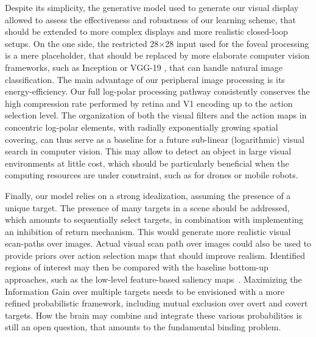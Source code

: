Despite its simplicity, the generative model used to generate our visual display allowed to assess the effectiveness and robustness of our learning scheme, that should be extended to more complex displays and more realistic closed-loop setups.
On the one side, the restricted 28$\times$28 input used for the foveal processing is a mere placeholder, that should be replaced by more elaborate computer vision frameworks, such as Inception \cite{szegedy2015going} or VGG-19
\cite{simonyan2014very}, that can handle natural image classification. 
The main advantage of our peripheral image processing is its  energy-efficiency. Our full log-polar processing pathway consistently conserves the high compression rate performed by retina and V1 encoding up to the action selection level. The organization of both the visual filters and the action maps in concentric log-polar elements, with radially exponentially growing spatial covering, can thus serve as a baseline for a future sub-linear (logarithmic) visual search in computer vision. This may allow to detect an object in large visual environments at little cost, which should be particularly beneficial when the computing resources are under constraint, such as for drones or mobile robots. 


Finally, our model relies on a strong idealization, assuming the presence of a unique target. The presence of many targets in a scene should be addressed, which amounts to sequentially select targets, in combination with implementing an inhibition of return mechanism. 
This would generate more realistic visual scan-paths over images. %
Actual visual scan path over images could also be used to provide priors over action selection maps that should improve realism.  %
Identified regions of interest may then be compared with the baseline bottom-up approaches, such as the low-level feature-based saliency maps~\cite{Itti01}. 
Maximizing the Information Gain over multiple targets needs to be envisioned with a more refined probabilistic framework, including mutual exclusion over overt and covert targets. How the brain may combine and integrate these various probabilities is still an open question, that amounts to the fundamental binding problem. %

